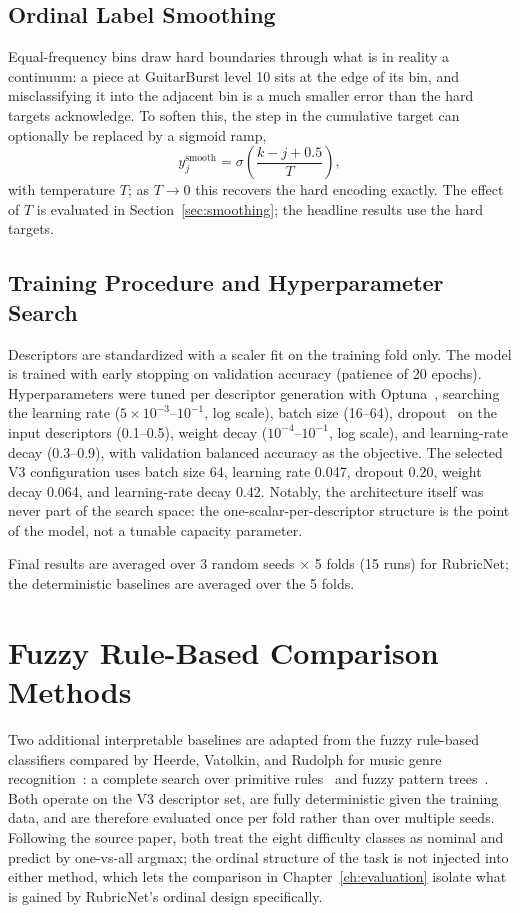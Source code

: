\subsection{Ordinal Label Smoothing}
Equal-frequency bins draw hard boundaries through what is in reality a continuum: a piece at GuitarBurst level 10 sits at the edge of its bin, and misclassifying it into the adjacent bin is a much smaller error than the hard targets acknowledge. To soften this, the step in the cumulative target can optionally be replaced by a sigmoid ramp,
\begin{equation}
    y_j^{\text{smooth}} = \sigma\!\left( \frac{k - j + 0.5}{T} \right),
\end{equation}
with temperature $T$; as $T \to 0$ this recovers the hard encoding exactly. The effect of $T$ is evaluated in Section~\ref{sec:smoothing}; the headline results use the hard targets.

\subsection{Training Procedure and Hyperparameter Search}
Descriptors are standardized with a scaler fit on the training fold only. The model is trained with early stopping on validation accuracy (patience of 20 epochs). Hyperparameters were tuned per descriptor generation with Optuna~\cite{akiba2019optuna}, searching the learning rate ($5 \times 10^{-3}$--$10^{-1}$, log scale), batch size (16--64), dropout~\cite{srivastava2014dropout} on the input descriptors (0.1--0.5), weight decay ($10^{-4}$--$10^{-1}$, log scale), and learning-rate decay (0.3--0.9), with validation balanced accuracy as the objective. The selected V3 configuration uses batch size 64, learning rate 0.047, dropout 0.20, weight decay 0.064, and learning-rate decay 0.42. Notably, the architecture itself was never part of the search space: the one-scalar-per-descriptor structure is the point of the model, not a tunable capacity parameter.

Final results are averaged over 3 random seeds $\times$ 5 folds (15 runs) for RubricNet; the deterministic baselines are averaged over the 5 folds.

\section{Fuzzy Rule-Based Comparison Methods}
\label{sec:fuzzy_method}
Two additional interpretable baselines are adapted from the fuzzy rule-based classifiers compared by Heerde, Vatolkin, and Rudolph for music genre recognition~\cite{heerde2020comparing}: a complete search over primitive rules~\cite{vatolkin2015interpretable} and fuzzy pattern trees~\cite{senge2011topdown, senge2015fast, huang2008patterntrees}. Both operate on the V3 descriptor set, are fully deterministic given the training data, and are therefore evaluated once per fold rather than over multiple seeds. Following the source paper, both treat the eight difficulty classes as nominal and predict by one-vs-all argmax; the ordinal structure of the task is not injected into either method, which lets the comparison in Chapter~\ref{ch:evaluation} isolate what is gained by RubricNet's ordinal design specifically.

